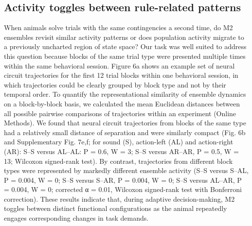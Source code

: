 \subsection{Activity toggles between rule-related patterns}
When animals solve trials with the same contingencies a second time, do M2 ensembles revisit similar activity patterns or does population activity migrate to a previously uncharted region of state space? Our task was well suited to address this question because blocks of the same trial type were presented multiple times within the same behavioral session. Figure 6a shows an example set of neural circuit trajectories for the first 12 trial blocks within one behavioral session, in which trajectories could be clearly grouped by block type and not by their temporal order. To quantify the representational similarity of ensemble dynamics on a block-by-block basis, we calculated the mean Euclidean distances between all possible pairwise comparisons of trajectories within an experiment (Online Methods). We found that neural circuit trajectories from blocks of the same type had a relatively small distance of separation and were similarly compact (Fig. 6b and Supplementary Fig. 7e,f; for sound (S), action-left (AL) and action-right (AR): S–S versus AL–AL: P = 0.6, W = 3; S–S versus AR–AR, P = 0.5, W = 13; Wilcoxon signed-rank test). By contrast, trajectories from different block types were represented by markedly different ensemble activity (S–S versus S–AL, P = 0.004, W = 0; S–S versus S–AR, P = 0.004, W = 0; S–S versus AL–AR, P = 0.004, W = 0; corrected α = 0.01, Wilcoxon signed-rank test with Bonferroni correction). These results indicate that, during adaptive decision-making, M2 toggles between distinct functional configurations as the animal repeatedly engages corresponding changes in task demands.

